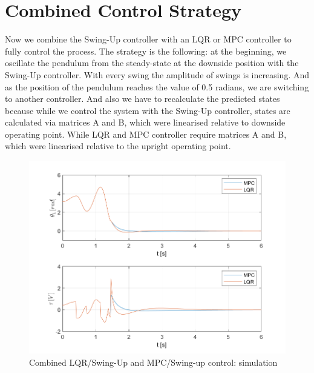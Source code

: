 \section{Combined Control Strategy}
Now we combine the Swing-Up controller with an LQR or MPC controller to fully control the process. The strategy is the following: at the beginning, we oscillate the pendulum from the steady-state at the downside position with the Swing-Up controller. With every swing the amplitude of swings is increasing. And as the position of the pendulum reaches the value of 0.5 radians, we are switching to another controller. And also we have to recalculate the predicted states because while we control the system with the Swing-Up controller, states are calculated via matrices A and B, which were linearised relative to downside operating point. While LQR and MPC controller require matrices A and B, which were linearised relative to the upright operating point.
\newpage
\begin{figure}[H]
	\centering
	\includegraphics[width=1.1\linewidth]{images/MPC-LQR_Swing}
	\caption{Combined LQR/Swing-Up and MPC/Swing-up control: simulation}
	\label{combo}
\end{figure}
\newpage
